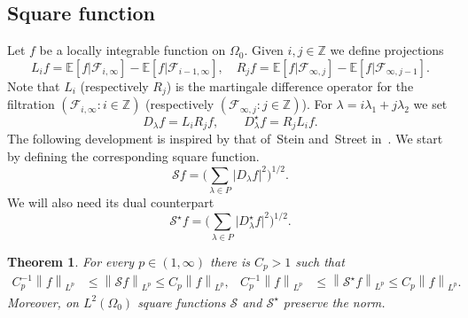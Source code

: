 \documentclass[a4paper]{amsart}
\newcommand{\norm}[1]{{\left\lVert #1 \right\rVert}}
\newcommand{\abs}[1]{{\lvert {#1} \rvert}}
\newcommand{\seq}[2]{\left({#1}: {#2}\right)}
\newcommand{\EE}{\mathbb{E}}
\newcommand{\ZZ}{\mathbb{Z}}
\newcommand{\calS}{\mathcal{S}}
\theoremstyle{plain}
\newtheorem{theorem}{Theorem}
\theoremstyle{definition}
\theoremstyle{remark}
\numberwithin{equation}{section}
\theoremstyle{plain}
\begin{document}
\subsection{Square function}
Let $f$ be a locally integrable function on $\Omega_0$. Given $i, j
\in \ZZ$ we define projections
\begin{equation*}
L_i f = \EE[f | \mathcal{F}_{i, \infty}] - \EE[f | \mathcal{F}_{i-1, \infty}],
\quad
R_j f = \EE[f | \mathcal{F}_{\infty, j}] - \EE[f | \mathcal{F}_{\infty, j-1}].
\end{equation*}
Note that $L_i$ (respectively $R_j$) is the martingale difference
operator for the filtration $\seq{\mathcal{F}_{i, \infty}}{i \in \ZZ}$
(respectively $\seq{\mathcal{F}_{\infty, j}}{j \in \ZZ}$). For
$\lambda = i \lambda_1 + j \lambda_2$ we set
\begin{equation*}
D_\lambda f = L_i R_j f, \qquad D_\lambda^\star f = R_j L_i f.
\end{equation*}
The following development is inspired by that of~Stein and~Street
in~\cite{stst}.  We start by defining the corresponding square function.
\begin{equation*}
\calS f = \Big(\sum_{\lambda \in P} \abs{D_\lambda f}^2 \Big)^{1/2}.
\end{equation*}
We will also need its dual counterpart
\begin{equation*}
\calS^\star f = \Big(\sum_{\lambda \in P} \abs{D_\lambda^\star f}^2 \Big)^{1/2}.
\end{equation*}
\begin{theorem}
  \label{th:5}
  For every $p \in (1, \infty)$ there is $C_p > 1$ such that 
  \begin{align*}
    C_p^{-1} \norm{f}_{L^p} &\leq \norm{\calS f}_{L^p} \leq C_p \norm{f}_{L^p},
    &
    C_p^{-1} \norm{f}_{L^p} &\leq \norm{\calS^\star f}_{L^p} \leq C_p \norm{f}_{L^p}.
  \end{align*}
  Moreover, on $L^2(\Omega_0)$ square functions $\calS$ and $\calS^\star$
  preserve the norm.
\end{theorem}
\end{document}
